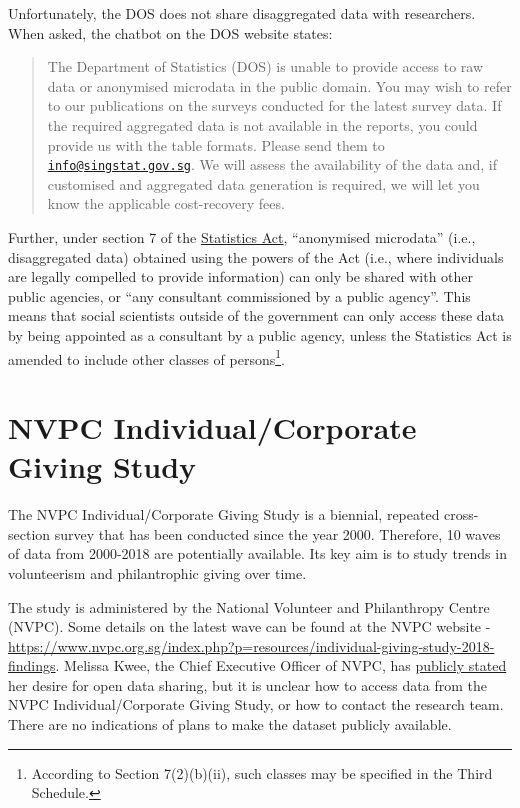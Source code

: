 \documentclass[
  openany]{book}
\begin{document}
Unfortunately, the DOS does not share disaggregated data with researchers. When asked, the chatbot on the DOS website states:

\begin{quote}
The Department of Statistics (DOS) is unable to provide access to raw data or anonymised microdata in the public domain. You may wish to refer to our publications on the surveys conducted for the latest survey data. If the required aggregated data is not available in the reports, you could provide us with the table formats. Please send them to \href{mailto:info@singstat.gov.sg}{\nolinkurl{info@singstat.gov.sg}}. We will assess the availability of the data and, if customised and aggregated data generation is required, we will let you know the applicable cost-recovery fees.
\end{quote}

Further, under section 7 of the \href{https://sso.agc.gov.sg/Act/SA1973}{Statistics Act}, ``anonymised microdata'' (i.e., disaggregated data) obtained using the powers of the Act (i.e., where individuals are legally compelled to provide information) can only be shared with other public agencies, or ``any consultant commissioned by a public agency''. This means that social scientists outside of the government can only access these data by being appointed as a consultant by a public agency, unless the Statistics Act is amended to include other classes of persons\footnote{According to Section 7(2)(b)(ii), such classes may be specified in the Third Schedule.}.

\hypertarget{nvpc-igs}{%
\section{NVPC Individual/Corporate Giving Study}\label{nvpc-igs}}

The NVPC Individual/Corporate Giving Study is a biennial, repeated cross-section survey that has been conducted since the year 2000. Therefore, 10 waves of data from 2000-2018 are potentially available. Its key aim is to study trends in volunteerism and philantrophic giving over time.

The study is administered by the National Volunteer and Philanthropy Centre (NVPC). Some details on the latest wave can be found at the NVPC website - \url{https://www.nvpc.org.sg/index.php?p=resources/individual-giving-study-2018-findings}. Melissa Kwee, the Chief Executive Officer of NVPC, has \href{https://www.todayonline.com/commentary/keeping-passion-alive-trying-change-world}{publicly stated} her desire for open data sharing, but it is unclear how to access data from the NVPC Individual/Corporate Giving Study, or how to contact the research team. There are no indications of plans to make the dataset publicly available.
\end{document}
